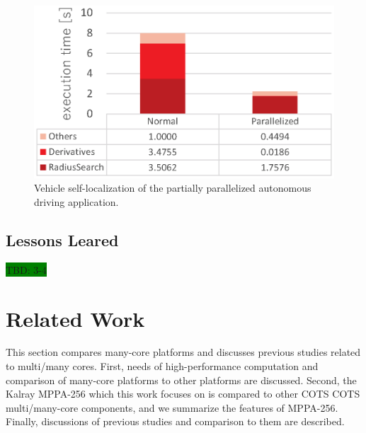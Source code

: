 \documentclass[conference,compsoc]{IEEEtran}
\begin{document}

\begin{figure}[t]
  \centering
  \includegraphics[width=1.0\linewidth]{../figure/BarGraph_ndt_matching.eps}
  \caption{\label{fig:ndt_matching}
  Vehicle self-localization of the partially parallelized autonomous driving application.}
\end{figure}

\subsection{Lessons Leared}
\label{sec:lessons}
\colorbox{green}{TBD: 3-4}

\section{Related Work}
\label{sec:related_work}
This section compares many-core platforms and discusses previous studies related to multi/many cores.
First, needs of high-performance computation and comparison of many-core platforms to other platforms are discussed.
Second, the Kalray MPPA-256 which this work focuses on is compared to other COTS COTS multi/many-core components, and we summarize the features of MPPA-256.
Finally, discussions of previous studies and comparison to them are described.
\end{document}
